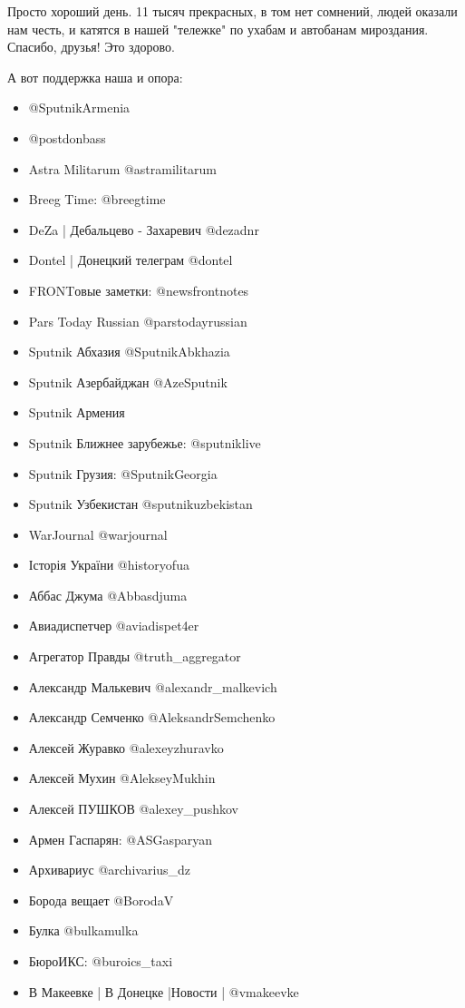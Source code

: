 \documentclass[a4paper,11pt]{book}
\begin{document}
Просто хороший день. 11 тысяч прекрасных, в том нет сомнений, людей оказали нам
честь, и катятся в нашей "тележке" по ухабам и автобанам мироздания. Спасибо,
друзья! Это здорово. 

А вот поддержка наша и опора: 

\begin{itemize}

\item @SputnikArmenia
\item @postdonbass 
\item Astra Militarum @astramilitarum
\item Breeg Time: @breegtime
\item DeZa | Дебальцево - Захаревич @dezadnr
\item Dontel | Донецкий телеграм @dontel 
\item FRONTовые заметки: @newsfrontnotes
\item Pars Today Russian @parstodayrussian 
\item Sputnik Абхазия @SputnikAbkhazia
\item Sputnik Азербайджан @AzeSputnik
\item Sputnik Армения 
\item Sputnik Ближнее зарубежье: @sputniklive
\item Sputnik Грузия: @SputnikGeorgia
\item Sputnik Узбекистан @sputnikuzbekistan
\item WarJournal @warjournal
\item Історія України @historyofua
\item Аббас Джума @Abbasdjuma
\item Авиадиспетчер @aviadispet4er 
\item Агрегатор Правды @truth\_aggregator
\item Александр Малькевич @alexandr\_malkevich 
\item Александр Семченко @AleksandrSemchenko
\item Алексей Журавко @alexeyzhuravko
\item Алексей Мухин @AlekseyMukhin
\item Алексей ПУШКОВ @alexey\_pushkov
\item Армен Гаспарян: @ASGasparyan
\item Архивариус @archivarius\_dz
\item Борода вещает @BorodaV
\item Булка @bulkamulka
\item БюроИКС: @buroics\_taxi
\item В Макеевке | В Донецке |Новости | @vmakeevke

\end{itemize}
\end{document}
